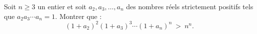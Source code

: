 Soit $n \geq 3$ un entier et soit $a_2, a_3, \ldots, a_n$ des nombres réels strictement positifs tels que
$a_2a_3\cdots a_n = 1$. Montrer que :
\[
(1 + a_2)^2(1 + a_3)^3\cdots(1 + a_n)^n \ > \ n^n.
\]
